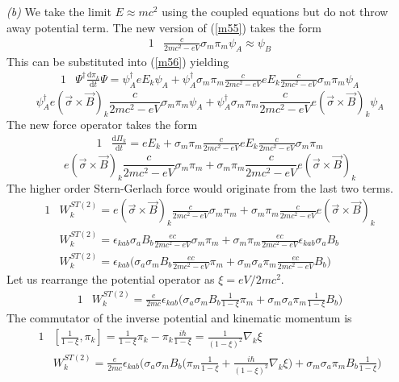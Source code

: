 \documentclass[]{article}
\numberwithin{equation}{subsection}
\begin{document}
\noindent\emph{(b)} We take the limit $E\approx mc^{2}$ using the coupled equations but do not throw away potential term. The new version of (\ref{m55}) takes the form
\begin{alignat}{1}
  \label{m72}		&\frac{c}{2mc^{2}-eV}\sigma_{m}\pi_{m}\psi_{A}\approx\psi_{B}
\end{alignat}
This can be substituted into (\ref{m56}) yielding
\begin{alignat}{1}
  \label{m73}		&\Psi^{\dagger}\frac{\mathrm{d}\pi_{k}}{\mathrm{d}t}\Psi=\psi^{\dagger}_{A}eE_{k}\psi_{A}+\psi^{\dagger}_{A}\sigma_{m}\pi_{m}\frac{c}{2mc^{2}-eV}eE_{k}\frac{c}{2mc^{2}-eV}\sigma_{m}\pi_{m}\psi_{A}
\end{alignat}
$$
\psi^{\dagger}_{A}e(\vec{\sigma}\times\vec{B})_{k}\frac{c}{2mc^{2}-eV}\sigma_{m}\pi_{m}\psi_{A}+\psi^{\dagger}_{A}\sigma_{m}\pi_{m}\frac{c}{2mc^{2}-eV}e(\vec{\sigma}\times\vec{B})_{k}\psi_{A}
$$
The new force operator takes the form
\begin{alignat}{1}
  \label{m74}		&\frac{\mathrm{d}\Pi_{k}}{\mathrm{d}t}=eE_{k}+\sigma_{m}\pi_{m}\frac{c}{2mc^{2}-eV}eE_{k}\frac{c}{2mc^{2}-eV}\sigma_{m}\pi_{m}
\end{alignat}
$$
  e(\vec{\sigma}\times\vec{B})_{k}\frac{c}{2mc^{2}-eV}\sigma_{m}\pi_{m}+\sigma_{m}\pi_{m}\frac{c}{2mc^{2}-eV}e(\vec{\sigma}\times\vec{B})_{k}
$$
The higher order Stern-Gerlach force would originate from the last two terms.
\begin{alignat}{1}
  \label{m75}  &W_{k}^{ST(2)}=e(\vec{\sigma}\times\vec{B})_{k}\frac{c}{2mc^{2}-eV}\sigma_{m}\pi_{m}+\sigma_{m}\pi_{m}\frac{c}{2mc^{2}-eV}e(\vec{\sigma}\times\vec{B})_{k}\\
  \label{m76}  &W_{k}^{ST(2)}=\epsilon_{kab}\sigma_{a}B_{b}\frac{ec}{2mc^{2}-eV}\sigma_{m}\pi_{m}+\sigma_{m}\pi_{m}\frac{ec}{2mc^{2}-eV}\epsilon_{kab}\sigma_{a}B_{b}\\
  \label{m77}  &W_{k}^{ST(2)}=\epsilon_{kab}\Big(\sigma_{a}\sigma_{m}B_{b}\frac{ec}{2mc^{2}-eV}\pi_{m}+\sigma_{m}\sigma_{a}\pi_{m}\frac{ec}{2mc^{2}-eV}B_{b}\Big)
\end{alignat}
Let us rearrange the potential operator as $\xi=eV/2mc^{2}$.
\begin{alignat}{1}
  \label{m78}  &W_{k}^{ST(2)}=\frac{e}{2mc}\epsilon_{kab}\Big(\sigma_{a}\sigma_{m}B_{b}\frac{1}{1-\xi}\pi_{m}+\sigma_{m}\sigma_{a}\pi_{m}\frac{1}{1-\xi}B_{b}\Big)
\end{alignat}
The commutator of the inverse potential and kinematic momentum is
\begin{alignat}{1}
  \label{m79}  &[\frac{1}{1-\xi},\pi_{k}]=\frac{1}{1-\xi}\pi_{k}-\pi_{k}\frac{i\hbar}{1-\xi}=\frac{1}{(1-\xi)^{2}}\nabla_{k}\xi\\
  \label{m80}  &W_{k}^{ST(2)}=\frac{e}{2mc}\epsilon_{kab}\Big(\sigma_{a}\sigma_{m}B_{b}\big(\pi_{m}\frac{1}{1-\xi}+\frac{i\hbar}{(1-\xi)^{2}}\nabla_{k}\xi\big)+\sigma_{m}\sigma_{a}\pi_{m}B_{b}\frac{1}{1-\xi}\Big)
\end{alignat}
\end{document}
